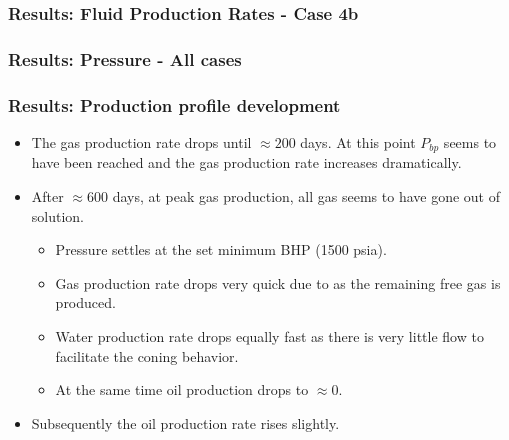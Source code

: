 

\begin{frame}
    \frametitle{Results: Fluid Production Rates - Case 4b}
    \centerline{}
\end{frame}

\begin{frame}
    \frametitle{Results: Pressure - All cases}
    \centerline{}
\end{frame}

\begin{frame}
    \frametitle{Results: Production profile development}
    \begin{itemize}
        \item The gas production rate drops until $\approx 200$ days. At this point $P_{bp}$ seems to have been reached and the gas production rate increases dramatically.
        \pause
        \item After $\approx 600$ days, at peak gas production, all gas seems to have gone out of solution.
        \begin{itemize}
            \item Pressure settles at the set minimum BHP (1500 psia).
            \item Gas production rate drops very quick due to  as the remaining free gas is produced.
            \item Water production rate drops equally fast as there is very little flow to facilitate the coning behavior.
            \item At the same time oil production drops to $\approx 0$.
        \end{itemize}
        \pause
        \item Subsequently the oil production rate rises slightly.
    \end{itemize}
\end{frame}

